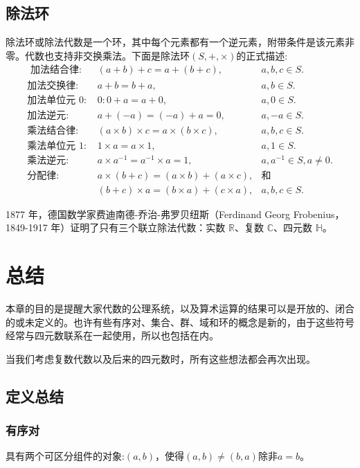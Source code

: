 \subsection{除法环}
除法环或除法代数是一个环，其中每个元素都有一个逆元素，附带条件是该元素非零。代数也支持非交换乘法。下面是除法环$(S,+, \times)$的正式描述:
$$
    \begin{array}{rlr}
        \text{ 加法结合律: } & (a+b)+c=a+(b+c), & a, b, c \in S .\\
        \text{加法交换律: } & a+b=b+a,          & a, b \in S .\\
        \text{加法单位元 0: } & 0: 0+a=a+0,       & a, 0 \in S .\\
        \text{加法逆元: }  &a+(-a)=(-a)+a=0,    & a, -a \in S .\\
        \text{乘法结合律: } &(a \times b) \times c=a \times(b \times c),& a, b, c \in S .\\
        \text{乘法单位元 1: } &1 \times a=a \times 1,& a, 1 \in S .\\
        \text{乘法逆元: } &a \times a^{-1}=a^{-1} \times a=1,& a,a^{-1}\in S ,a\neq 0.\\
        \text{分配律: } & a\times(b+c)=(a \times b)+(a \times c), &\text{和}\\
        &(b+c) \times a=(b \times a)+(c \times a), & a, b, c \in S .
\end{array}
$$

1877 年，德国数学家费迪南德-乔治-弗罗贝纽斯（Ferdinand Georg Frobenius，1849-1917 年）证明了只有三个联立除法代数：实数 $\mathbb{R}$、复数 $\mathbb{C}$、四元数 $\mathbb{H}$。

\section{总结}
本章的目的是提醒大家代数的公理系统，以及算术运算的结果可以是开放的、闭合的或未定义的。也许有些有序对、集合、群、域和环的概念是新的，由于这些符号经常与四元数联系在一起使用，所以也包括在内。

当我们考虑复数代数以及后来的四元数时，所有这些想法都会再次出现。

\subsection{定义总结}
\subsubsection*{有序对}
具有两个可区分组件的对象:$(a, b)$，使得$(a, b) \neq(b, a)$除非$a=b$。
